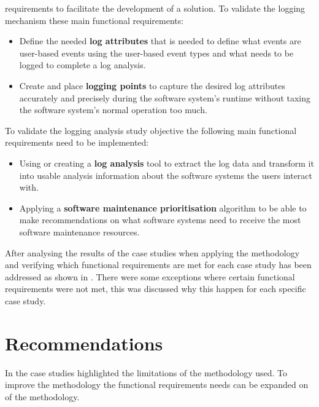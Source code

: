 \begin{enumerate}[label=\textbf{\Roman*.}]
	requirements to facilitate the development of a solution. To validate the logging mechanism
	these main functional requirements:
	 \begin{itemize}
		\item Define the needed \textbf{log attributes} that is needed to define what events are
		user-based events using the user-based event types and what needs to be logged to complete a
		log analysis.
		\item Create and place \textbf{logging points} to capture the desired log attributes
		accurately and precisely during the software system's runtime without taxing the software
		system's normal operation too much.
	 \end{itemize}

	 To validate the logging analysis study objective the following main functional requirements
	 need to be implemented:
	 \begin{itemize}
		\item Using or creating a \textbf{log analysis} tool to extract the log data and transform
		it into usable analysis information about the software systems the users interact with.
		\item Applying a \textbf{software maintenance prioritisation} algorithm to be able to make
		recommendations on what software systems need to receive the most software maintenance
		resources.
	 \end{itemize}

	 After analysing the results of the case studies when applying the methodology and verifying
	 which functional requirements are met for each case study has been addressed as shown in
	 . There were some exceptions where certain functional
	 requirements were not met, this was discussed why this happen for each specific case study.
\end{enumerate}

\section{Recommendations}
In  the case studies highlighted the limitations of the methodology used.
To improve the methodology the functional requirements needs can be expanded on of the methodology.

